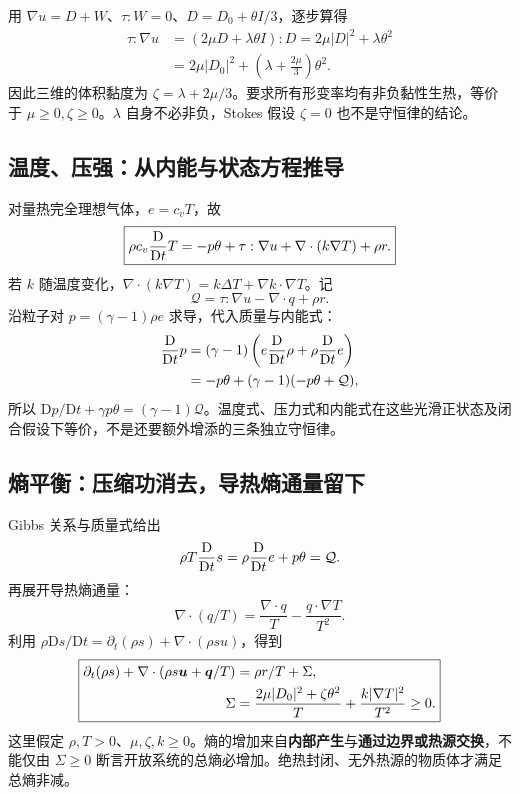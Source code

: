 用 $\nabla u=D+W$、$\tau:W=0$、$D=D_0+\theta I/3$，逐步算得
\begin{align}
 \tau:\nabla u&=(2\mu D+\lambda\theta I):D
 =2\mu|D|^2+\lambda\theta^2\\
 &=2\mu|D_0|^2+\left(\lambda+\frac{2\mu}{3}\right)\theta^2.
\end{align}
因此三维的体积黏度为 $\zeta=\lambda+2\mu/3$。要求所有形变率均有非负黏性生热，等价于 $\mu\ge0,\zeta\ge0$。$\lambda$ 自身不必非负，Stokes 假设 $\zeta=0$ 也不是守恒律的结论。

\subsection{温度、压强：从内能与状态方程推导}

对量热完全理想气体，$e=c_vT$，故
\begin{equation}
 \boxed{\rho c_v\frac{\mathrm D}{\mathrm Dt} T=-p\theta+\tau:\nabla u
 +\nabla\cdot(k\nabla T)+\rho r.}\label{eq:cns-temperature}
\end{equation}
若 $k$ 随温度变化，$\nabla\cdot(k\nabla T)=k\Delta T+\nabla k\cdot\nabla T$。记
\begin{equation}
 \mathcal Q=\tau:\nabla u-\nabla\cdot q+\rho r.
\end{equation}
沿粒子对 $p=(\gamma-1)\rho e$ 求导，代入质量与内能式：
\begin{align}
 \frac{\mathrm D}{\mathrm Dt} p&=(\gamma-1)\left(e\frac{\mathrm D}{\mathrm Dt}\rho+\rho\frac{\mathrm D}{\mathrm Dt} e\right)\\
 &=-p\theta+(\gamma-1)(-p\theta+\mathcal Q),
\end{align}
所以 $\mathrm Dp/\mathrm Dt+\gamma p\theta=(\gamma-1)\mathcal Q$。温度式、压力式和内能式在这些光滑正状态及闭合假设下等价，不是还要额外增添的三条独立守恒律。

\subsection{熵平衡：压缩功消去，导热熵通量留下}

Gibbs 关系与质量式给出
\begin{equation}
 \rho T\frac{\mathrm D}{\mathrm Dt} s=\rho\frac{\mathrm D}{\mathrm Dt} e+p\theta=\mathcal Q.
\end{equation}
再展开导热熵通量：
\begin{equation}
 \nabla\cdot(q/T)=\frac{\nabla\cdot q}{T}-\frac{q\cdot\nabla T}{T^2}.
\end{equation}
利用 $\rho\mathrm Ds/\mathrm Dt=\partial_t(\rho s)+\nabla\cdot(\rho s u)$，得到
\begin{equation}
 \boxed{\begin{aligned}
 \partial_t(\rho s)+\nabla\cdot(\rho s\bm{u}+\bm{q}/T)
 &=\rho r/T+\Sigma,\\
 \Sigma&=\frac{2\mu|D_0|^2+\zeta\theta^2}{T}
 +\frac{k|\nabla T|^2}{T^2}\ge0.
 \end{aligned}}\label{eq:cns-entropy-detail}
\end{equation}
这里假定 $\rho,T>0$、$\mu,\zeta,k\ge0$。熵的增加来自\textbf{内部产生}与\textbf{通过边界或热源交换}，不能仅由 $\Sigma\ge0$ 断言开放系统的总熵必增加。绝热封闭、无外热源的物质体才满足总熵非减。

